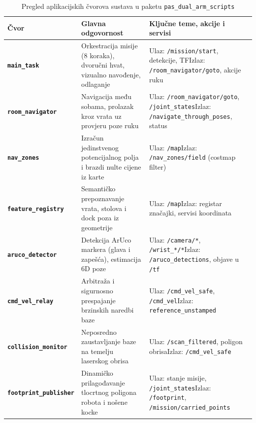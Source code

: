 \begin{table}[H]
  \centering
  \scriptsize
  \caption{Pregled aplikacijskih čvorova sustava u paketu \texttt{pas\_dual\_arm\_scripts}}
  \label{tab:cvorovi}
  \begin{tabularx}{\textwidth}{@{}>{\bfseries}p{2.8cm}>{\raggedright\arraybackslash}X>{\raggedright\arraybackslash}p{4.6cm}@{}}
    \toprule
    Čvor & Glavna odgovornost & Ključne teme, akcije i servisi \\
    \midrule
    \texttt{main\_task} & Orkestracija misije (8 koraka), dvoručni hvat, vizualno navođenje, odlaganje & Ulaz: \texttt{/mission/start}, detekcije, TF\newline Izlaz: \texttt{/room\_navigator/goto}, akcije ruku \\
    \texttt{room\_navigator} & Navigacija među sobama, prolazak kroz vrata uz provjeru poze ruku & Ulaz: \texttt{/room\_navigator/goto}, \texttt{/joint\_states}\newline Izlaz: \texttt{/navigate\_through\_poses}, status \\
    \texttt{nav\_zones} & Izračun jedinstvenog potencijalnog polja i brazdi nulte cijene iz karte & Ulaz: \texttt{/map}\newline Izlaz: \texttt{/nav\_zones/field} (costmap filter) \\
    \texttt{feature\_registry} & Semantičko prepoznavanje vrata, stolova i dock poza iz geometrije & Ulaz: \texttt{/map}\newline Izlaz: registar značajki, servisi koordinata \\
    \texttt{aruco\_detector} & Detekcija ArUco markera (glava i zapešća), estimacija 6D poze & Ulaz: \texttt{/camera/*}, \texttt{/wrist\_*/*}\newline Izlaz: \texttt{/aruco\_detections}, objave u \texttt{/tf} \\
    \texttt{cmd\_vel\_relay} & Arbitraža i sigurnosno prespajanje brzinskih naredbi baze & Ulaz: \texttt{/cmd\_vel\_safe}, \texttt{/cmd\_vel}\newline Izlaz: \texttt{reference\_unstamped} \\
    \texttt{collision\_monitor} & Neposredno zaustavljanje baze na temelju laserskog obrisa & Ulaz: \texttt{/scan\_filtered}, poligon obrisa\newline Izlaz: \texttt{/cmd\_vel\_safe} \\
    \texttt{footprint\_publisher} & Dinamičko prilagođavanje tlocrtnog poligona robota i nošene kocke & Ulaz: stanje misije, \texttt{/joint\_states}\newline Izlaz: \texttt{/footprint}, \texttt{/mission/carried\_points} \\

\end{tabularx}
\end{table}
